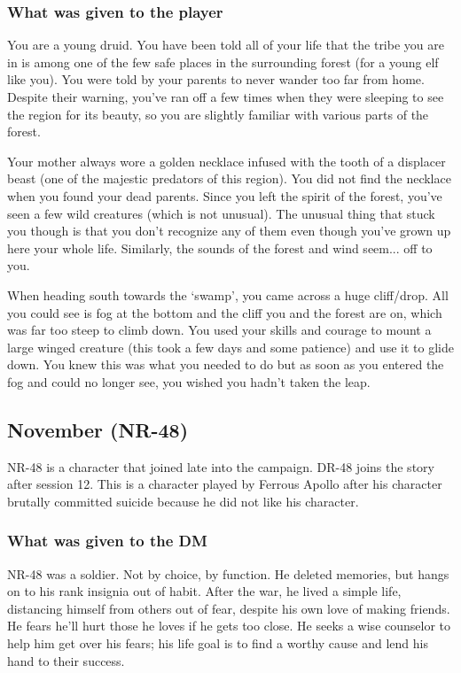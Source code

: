 \subsubsection{What was given to the player}

You are a young druid. You have been told all of your life that the tribe you are in is among one of the few safe places in the surrounding forest (for a young elf like you). You were told by your parents to never wander too far from home. Despite their warning, you've ran off a few times when they were sleeping to see the region for its beauty, so you are slightly familiar with various parts of the forest.

Your mother always wore a golden necklace infused with the tooth of a displacer beast (one of the majestic predators of this region). You did not find the necklace when you found your dead parents. Since you left the spirit of the forest, you've seen a few wild creatures (which is not unusual). The unusual thing that stuck you though is that you don't recognize any of them even though you've grown up here your whole life. Similarly, the sounds of the forest and wind seem... off to you. 

When heading south towards the `swamp', you came across a huge cliff/drop. All you could see is fog at the bottom and the cliff you and the forest are on, which was far too steep to climb down. You used your skills and courage to mount a large winged creature (this took a few days and some patience) and use it to glide down. You knew this was what you needed to do but as soon as you entered the fog and could no longer see, you wished you hadn't taken the leap.

\subsection{November (NR-48)}

NR-48 is a character that joined late into the campaign. DR-48 joins the story after session 12. This is a character played by Ferrous Apollo after his character brutally committed suicide because he did not like his character.

\subsubsection{What was given to the DM}

NR-48 was a soldier. Not by choice, by function. He deleted memories, but hangs on to his rank insignia out of habit. After the war, he lived a simple life, distancing himself from others out of fear, despite his own love of making friends. He fears he'll hurt those he loves if he gets too close. He seeks a wise counselor to help him get over his fears; his life goal is to find a worthy cause and lend his hand to their success.

